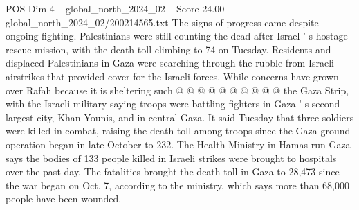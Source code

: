 \begin{textsample}{POS Dim 4 – global\_north\_2024\_02 – Score 24.00 – global\_north\_2024\_02/200214565.txt}
The signs of progress came despite ongoing fighting.
Palestinians were still counting the dead after Israel ' s hostage rescue mission, with the death toll climbing to 74 on Tuesday.
Residents and displaced Palestinians in Gaza were searching through the rubble from Israeli airstrikes that provided cover for the Israeli forces.
While concerns have grown over Rafah because it is sheltering such @ @ @ @ @ @ @ @ @ @ the Gaza Strip, with the Israeli military saying troops were battling fighters in Gaza ' s second largest city, Khan Younis, and in central Gaza.
It said Tuesday that three soldiers were killed in combat, raising the death toll among troops since the Gaza ground operation began in late October to 232.
The Health Ministry in Hamas-run Gaza says the bodies of 133 people killed in Israeli strikes were brought to hospitals over the past day.
The fatalities brought the death toll in Gaza to 28,473 since the war began on Oct. 7, according to the ministry, which says more than 68,000 people have been wounded.

\end{textsample}
